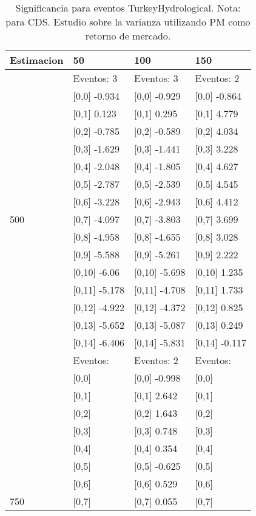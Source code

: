 \begin{table}

\caption{Significancia para eventos TurkeyHydrological. Nota: para CDS. Estudio sobre la varianza utilizando PM como retorno de mercado.}
\centering
\begin{tabular}[t]{llll}
\toprule
Estimacion & 50 & 100 & 150\\
\midrule
 & Eventos:  3 & Eventos:  3 & Eventos:  2\\
 & {}[0,0] -0.934 & {}[0,0] -0.929 & {}[0,0] -0.864\\
 & {}[0,1] 0.123 & {}[0,1] 0.295 & {}[0,1] 4.779\\
 & {}[0,2] -0.785 & {}[0,2] -0.589 & {}[0,2] 4.034\\
 & {}[0,3] -1.629 & {}[0,3] -1.441 & {}[0,3] 3.228\\
\addlinespace
 & {}[0,4] -2.048 & {}[0,4] -1.805 & {}[0,4] 4.627\\
 & {}[0,5] -2.787 & {}[0,5] -2.539 & {}[0,5] 4.545\\
 & {}[0,6] -3.228 & {}[0,6] -2.943 & {}[0,6] 4.412\\
500 & {}[0,7] -4.097 & {}[0,7] -3.803 & {}[0,7] 3.699\\
 & {}[0,8] -4.958 & {}[0,8] -4.655 & {}[0,8] 3.028\\
\addlinespace
 & {}[0,9] -5.588 & {}[0,9] -5.261 & {}[0,9] 2.222\\
 & {}[0,10] -6.06 & {}[0,10] -5.698 & {}[0,10] 1.235\\
 & {}[0,11] -5.178 & {}[0,11] -4.708 & {}[0,11] 1.733\\
 & {}[0,12] -4.922 & {}[0,12] -4.372 & {}[0,12] 0.825\\
 & {}[0,13] -5.652 & {}[0,13] -5.087 & {}[0,13] 0.249\\
\addlinespace
 & {}[0,14] -6.406 & {}[0,14] -5.831 & {}[0,14] -0.117\\
 & Eventos: & Eventos:  2 & Eventos:\\
 & {}[0,0] & {}[0,0] -0.998 & {}[0,0]\\
 & {}[0,1] & {}[0,1] 2.642 & {}[0,1]\\
 & {}[0,2] & {}[0,2] 1.643 & {}[0,2]\\
\addlinespace
 & {}[0,3] & {}[0,3] 0.748 & {}[0,3]\\
 & {}[0,4] & {}[0,4] 0.354 & {}[0,4]\\
 & {}[0,5] & {}[0,5] -0.625 & {}[0,5]\\
 & {}[0,6] & {}[0,6] 0.529 & {}[0,6]\\
750 & {}[0,7] & {}[0,7] 0.055 & {}[0,7]\\

\end{tabular}
\end{table}

